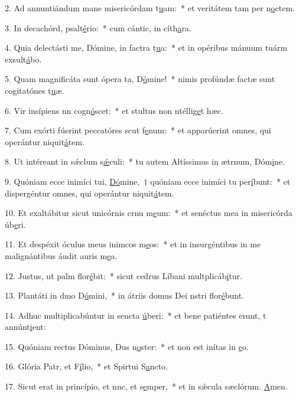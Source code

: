 2. Ad annuntiándum mane misericórdam t\uline{u}am:~* et veritátem tam per n\uline{o}ctem.\par 
3. In decachórd, psalt\uline{é}rio:~* cum cántic, in cíth\uline{a}ra.\par 
4. Quia delectásti me, Dómine, in factra t\uline{u}a:~* et in opéribus mánuum tuárm exsult\uline{á}bo.\par 
5. Quam magnificáta sunt ópera ta, D\uline{ó}mine!~* nimis profúndæ factæ sunt cogitatónes t\uline{u}æ.\par 
6. Vir insípiens nn cogn\uline{ó}scet:~* et stultus non ntéllig\uline{e}t hæc.\par 
7. Cum exórti fúerint peccatóres scut f\uline{e}num:~* et apparúerint omnes, qui operántur niquit\uline{á}tem.\par 
8. Ut intéreant in sǽclum s\uline{ǽ}culi:~* tu autem Altíssimus in ætrnum, Dóm\uline{i}ne.\par 
9. Quóniam ecce inimíci tui, \uline{Dó}mine,~† quóniam ecce inimíci tu per\uline{í}bunt:~* et dispergéntur omnes, qui operántur niquit\uline{á}tem.\par 
10. Et exaltábitur sicut unicórnis crnu m\uline{e}um:~* et senéctus mea in misericórda úb\uline{e}ri.\par 
11. Et despéxit óculus meus inimcos m\uline{e}os:~* et in insurgéntibus in me malignántibus áudit auris m\uline{e}a.\par 
12. Justus, ut palm flor\uline{é}bit:~* sicut cedrus Líbani multplicáb\uline{i}tur.\par 
13. Plantáti in dmo D\uline{ó}mini,~* in átriis domus Dei nstri flor\uline{é}bunt.\par 
14. Adhuc multiplicabúntur in sencta \uline{ú}beri:~* et bene patiéntes erunt, t annúnt\uline{i}ent:\par 
15. Quóniam rectus Dóminus, Dus n\uline{o}ster:~* et non est inítas in \uline{e}o.\par 
16. Glória Patr, et F\uline{í}lio,~* et Spirtui S\uline{a}ncto.\par 
17. Sicut erat in princípio, et nnc, et s\uline{e}mper,~* et in sǽcula sæclórum. \uline{A}men.\par 
